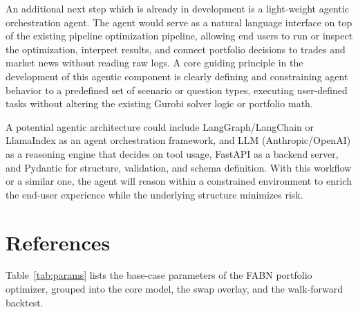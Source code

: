 \documentclass[12pt]{article}
\begin{document}
An additional next step which is already in development is a light-weight agentic orchestration agent. The agent would serve as a natural language interface on top of the existing pipeline optimization pipeline, allowing end users to run or inspect the optimization, interpret results, and connect portfolio decisions to trades and market news without reading raw logs. A core guiding principle in the development of this agentic component is clearly defining and constraining agent behavior to a predefined set of scenario or question types, executing user-defined tasks without altering the existing Gurobi solver logic or portfolio math.

A potential agentic architecture could include LangGraph/LangChain or LlamaIndex as an agent orchestration framework, and LLM (Anthropic/OpenAI) as a reasoning engine that decides on tool usage, FastAPI as a backend server, and Pydantic for structure, validation, and schema definition. With this workflow or a similar one, the agent will reason within a constrained environment to enrich the end-user experience while the underlying structure minimizes risk.

\newpage
\section{References}

\renewcommand{\section}[2]{}
\printbibliography

\newpage
\section*{Appendix A. Optimizer Parameters}

\setcounter{table}{0}
\renewcommand{\thetable}{A\arabic{table}}

Table~\ref{tab:params} lists the base-case parameters of the FABN portfolio optimizer, grouped into the core model, the swap overlay, and the walk-forward backtest.
\end{document}
